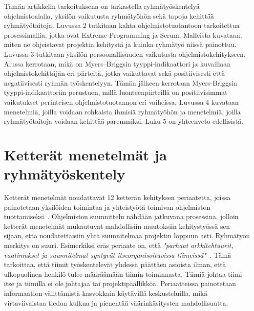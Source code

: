 \documentclass[finnish]{../tktltiki2}
\theoremstyle{definition}
\theoremstyle{remark}
\begin{document}
Tämän artikkelin tarkoituksena on tarkastella ryhmätyöskentelyä ohjelmistoalalla, yksilön vaikutusta ryhmätyöhön sekä tapoja kehittää ryhmätyö\-taitoja.
Luvussa 2 tutkitaan kahta ohjelmistotuotantoon tarkoitettua
prosessimallia, jotka ovat Extreme Programming ja Scrum. Malleista
kuvataan, miten ne ohjeistavat projektin kehitystä ja kuinka ryhmätyö niissä painottuu. Luvussa 3 tutkitaan yksilön persoonallisuuden vaikutusta ohjelmistokehitykseen. Alussa kerrotaan,
mikä on Myers--Briggsin tyyppi-indikaattori ja kuvaillaan ohjelmistokehittäjän eri piirteitä, jotka vaikuttavat sekä positiivisesti että negatiivisesti ryhmän työskentelyyn. Tämän jälkeen kerrotaan Myers-Briggsin tyyppi-indikaattoriin perustuen, millä luonteenpiirteillä on positiivisimmat vaikutukset perinteisen ohjelmistotuotannon eri vaiheissa. Luvussa 4 kuvataan
menetelmiä, joilla voidaan rohkaista ihmisiä ryhmätyöhön ja menetelmiä, joilla ryhmätyötaitoja voidaan kehittää paremmiksi. Luku 5 on yhteenveto
edellisistä.

\section{Ketterät menetelmät ja ryhmätyöskentely}


Ketterät menetelmät noudattavat 12 ketterän 
kehityksen periaatetta, joissa painotetaan yksilöiden toimintaa ja yhteistyötä toimivan ohjelmiston tuottamiseksi~\cite{AgileManifesto}. Ohjelmiston suunnittelu nähdään jatkuvana prosessina, jolloin ketterät menetelmät mukautuvat mahdollisiin muutoksiin kehitystyössä sen sijaan, että noudatettaisiin yhtä suunnitelmaa projektin loppuun asti. Ryhmätyön merkitys on suuri. Esimerkiksi eräs periaate on, että 
\emph{"parhaat arkkitehtuurit, vaatimukset ja suunnitelmat syntyvät 
itseorganisoituvissa
tiimeissä"}~\cite{AgileManifesto}. Tämä tarkoittaa, että tiimit työskentelevät 
yhdessä päättäen asioista ilman, että ulkopuolinen henkilö tulee
määräämään tiimin toiminnasta. Tiimiä johtaa tiimi itse ja 
tiimillä ei ole johtajaa tai projektipäällikköä. Periaatteissa 
painotetaan informaation välittämistä kasvokkain käytävillä keskusteluilla, mikä virtaviivaistaa tiedon kulkua ja pienentää 
väärinkäsitysten mahdollisuutta.\\
\end{document}
